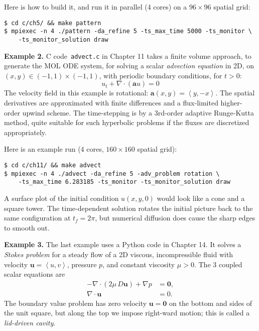 \documentclass[12pt]{amsart}
\newcommand{\bu}{\mathbf{u}}
\newcommand{\Div}{\nabla\cdot}
\newcommand{\grad}{\nabla}
\begin{document}
Here is how to build it, and run it in parallel (4 cores) on a $96\times 96$ spatial grid:

\medskip
\begin{Verbatim}[fontsize=\small]
$ cd c/ch5/ && make pattern
$ mpiexec -n 4 ./pattern -da_refine 5 -ts_max_time 5000 -ts_monitor \
    -ts_monitor_solution draw
\end{Verbatim}

\bigskip
\noindent \textbf{Example 2.}  C code \,\texttt{advect.c} in Chapter 11 takes a finite volume approach, to generate the MOL ODE system, for solving a scalar \emph{advection equation} in 2D, on $(x,y) \in (-1,1)\times (-1,1)$, with periodic boundary conditions, for $t>0$:
    $$u_t + \nabla \cdot (\mathbf{a} u) = 0$$
The velocity field in this example is rotational: $\mathbf{a}(x,y) = \left<y, -x\right>$.  The spatial derivatives are approximated with finite differences and a flux-limited higher-order upwind scheme.  The time-stepping is by a 3rd-order adaptive Runge-Kutta method, quite suitable for such hyperbolic problems if the fluxes are discretized appropriately.

Here is an example run (4 cores, $160\times 160$ spatial grid):

\medskip
\begin{Verbatim}[fontsize=\small]
$ cd c/ch11/ && make advect
$ mpiexec -n 4 ./advect -da_refine 5 -adv_problem rotation \
    -ts_max_time 6.283185 -ts_monitor -ts_monitor_solution draw
\end{Verbatim}

\medskip
A surface plot of the initial condition $u(x,y,0)$ would look like a cone and a square tower.  The time-dependent solution rotates the initial picture back to the same configuration at $t_f = 2\pi$, but numerical diffusion does cause the sharp edges to smooth out.  

\bigskip
\noindent \textbf{Example 3.}  The last example uses a Python code in Chapter 14.  It solves a \emph{Stokes problem} for a steady flow of a 2D viscous, incompressible fluid with velocity $\bu=\left<u,v\right>$, pressure $p$, and constant viscosity $\mu>0$.  The 3 coupled scalar equations are
\begin{align*}
- \Div \left(2 \mu\, D \bu\right) + \grad p &= \bm{0}, \\
\Div \bu &= 0.
\end{align*}
The boundary value problem has zero velocity $\bu=\bm{0}$ on the bottom and sides of the unit square, but along the top we impose right-ward motion; this is called a \emph{lid-driven cavity}.
\end{document}
